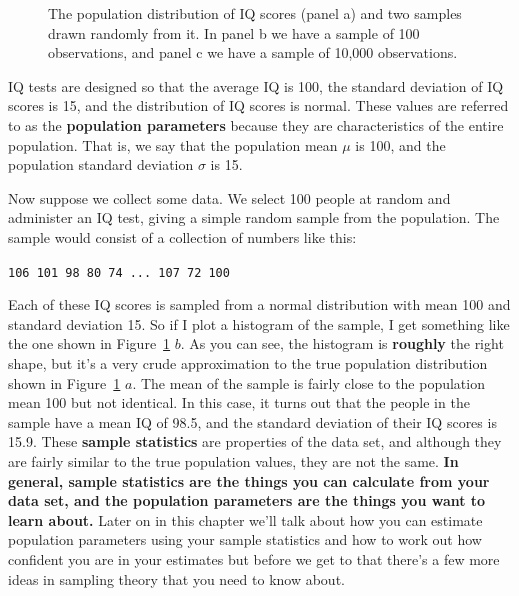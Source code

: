 \documentclass[
  letterpaper,
  DIV=11,
  numbers=noendperiod]{scrreprt}
\begin{document}
\begin{figure}


\caption{\label{fig-IQdist}The population distribution of IQ scores
(panel a) and two samples drawn randomly from it. In panel b we have a
sample of 100 observations, and panel c we have a sample of 10,000
observations.}

\end{figure}%

IQ tests are designed so that the average IQ is 100, the standard
deviation of IQ scores is 15, and the distribution of IQ scores is
normal. These values are referred to as the \textbf{population
parameters} because they are characteristics of the entire population.
That is, we say that the population mean \(\mu\) is 100, and the
population standard deviation \(\sigma\) is 15.

Now suppose we collect some data. We select 100 people at random and
administer an IQ test, giving a simple random sample from the
population. The sample would consist of a collection of numbers like
this:

\texttt{106\ 101\ 98\ 80\ 74\ ...\ 107\ 72\ 100}

Each of these IQ scores is sampled from a normal distribution with mean
100 and standard deviation 15. So if I plot a histogram of the sample, I
get something like the one shown in Figure~\ref{fig-IQdist} \(b\). As
you can see, the histogram is \textbf{roughly} the right shape, but it's
a very crude approximation to the true population distribution shown in
Figure~\ref{fig-IQdist} \(a\). The mean of the sample is fairly close to
the population mean 100 but not identical. In this case, it turns out
that the people in the sample have a mean IQ of 98.5, and the standard
deviation of their IQ scores is 15.9. These \textbf{sample statistics}
are properties of the data set, and although they are fairly similar to
the true population values, they are not the same. \textbf{In general,
sample statistics are the things you can calculate from your data set,
and the population parameters are the things you want to learn about.}
Later on in this chapter we'll talk about how you can estimate
population parameters using your sample statistics and how to work out
how confident you are in your estimates but before we get to that
there's a few more ideas in sampling theory that you need to know about.
\end{document}
